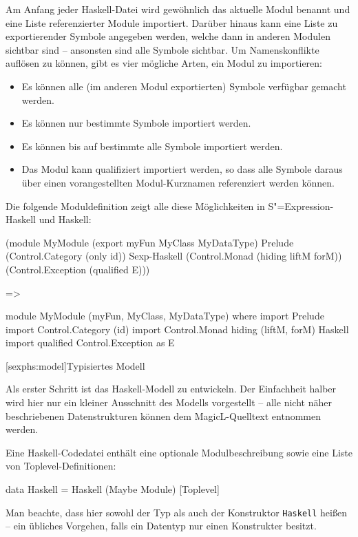 \documentclass[12pt, a4paper, bibgerm]{scrbook}
\newenvironment{DIFnomarkup}{}{}
\newcommand\icode[1]{\lstinline?#1?}
\newcommand\lsection{}
\newcommand{\sexp}{S"=Expression}
\begin{document}
Am Anfang jeder Haskell-Datei wird gewöhnlich das aktuelle Modul
benannt und eine Liste referenzierter Module importiert. Darüber
hinaus kann eine Liste zu exportierender Symbole angegeben werden,
welche dann in anderen Modulen sichtbar sind -- ansonsten sind alle
Symbole sichtbar. Um Namenskonflikte auflösen zu können, gibt es vier
mögliche Arten, ein Modul zu importieren:
\begin{itemize}
\item Es können alle (im anderen Modul exportierten) Symbole verfügbar gemacht
  werden.
\item Es können nur bestimmte Symbole importiert werden.
\item Es können bis auf bestimmte alle Symbole importiert werden.
\item Das Modul kann qualifiziert importiert werden, so dass alle
  Symbole daraus über einen vorangestellten Modul-Kurznamen
  referenziert werden können.
\end{itemize}
Die folgende Moduldefinition zeigt alle diese Möglichkeiten in
\sexp{}-Haskell und Haskell:
\begin{DIFnomarkup}\begin{code}
(module MyModule
  (export myFun MyClass MyDataType)
  Prelude
  (Control.Category (only id))                       Sexp-Haskell
  (Control.Monad (hiding liftM forM))
  (Control.Exception (qualified E)))

=>

module MyModule (myFun, MyClass, MyDataType) where
import Prelude
import Control.Category (id)
import Control.Monad hiding (liftM, forM)            Haskell
import qualified Control.Exception as E
\end{code}\end{DIFnomarkup}


\lsection[sexphs:model]{Typisiertes Modell}

Als erster Schritt ist das Haskell-Modell zu entwickeln. Der Einfachheit
halber wird hier nur ein kleiner Ausschnitt des Modells vorgestellt --
alle nicht näher beschriebenen Datenstrukturen können dem
MagicL-Quelltext entnommen werden.

Eine Haskell-Codedatei enthält eine optionale Modulbeschreibung sowie
eine Liste von Toplevel-Definitionen:
\begin{DIFnomarkup}\begin{code}
data Haskell = Haskell (Maybe Module) [Toplevel]
\end{code}\end{DIFnomarkup}
Man beachte, dass hier sowohl der Typ als auch der Konstruktor
\icode{Haskell} heißen -- ein übliches Vorgehen, falls ein Datentyp nur
einen Konstrukter besitzt.
\end{document}
